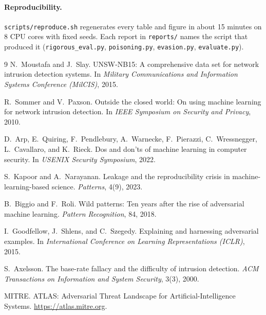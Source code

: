 \documentclass[11pt,a4paper]{article}
\newcommand{\code}[1]{\texttt{#1}}
\begin{document}
\paragraph{Reproducibility.} \code{scripts/reproduce.sh} regenerates every
table and figure in about 15 minutes on 8 CPU cores with fixed seeds. Each
report in \code{reports/} names the script that produced it
(\code{rigorous\_eval.py}, \code{poisoning.py}, \code{evasion.py},
\code{evaluate.py}).

\begin{thebibliography}{9}
\small
{} N.~Moustafa and J.~Slay. UNSW-NB15: A comprehensive
data set for network intrusion detection systems. In \emph{Military
Communications and Information Systems Conference (MilCIS)}, 2015.

 R.~Sommer and V.~Paxson. Outside the closed world: On
using machine learning for network intrusion detection. In \emph{IEEE
Symposium on Security and Privacy}, 2010.

 D.~Arp, E.~Quiring, F.~Pendlebury, A.~Warnecke, F.~Pierazzi,
C.~Wressnegger, L.~Cavallaro, and K.~Rieck. Dos and don'ts of machine learning
in computer security. In \emph{USENIX Security Symposium}, 2022.

 S.~Kapoor and A.~Narayanan. Leakage and the
reproducibility crisis in machine-learning-based science. \emph{Patterns},
4(9), 2023.

 B.~Biggio and F.~Roli. Wild patterns: Ten years after the
rise of adversarial machine learning. \emph{Pattern Recognition}, 84, 2018.

 I.~Goodfellow, J.~Shlens, and C.~Szegedy. Explaining
and harnessing adversarial examples. In \emph{International Conference on
Learning Representations (ICLR)}, 2015.

 S.~Axelsson. The base-rate fallacy and the difficulty
of intrusion detection. \emph{ACM Transactions on Information and System
Security}, 3(3), 2000.

 MITRE. ATLAS: Adversarial Threat Landscape for
Artificial-Intelligence Systems. \url{https://atlas.mitre.org}.
\end{thebibliography}
\end{document}
